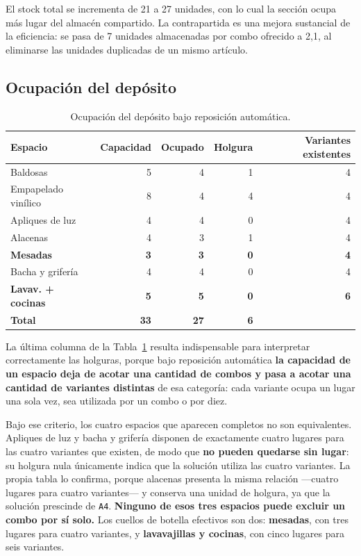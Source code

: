 \documentclass[10pt,a4paper]{article}
\newcommand{\cuello}[1]{\textbf{\textcolor{limita}{#1}}}
\newcommand{\art}[1]{\texttt{#1}}
\begin{document}
El stock total se incrementa de 21 a 27 unidades, con lo cual la sección ocupa
más lugar del almacén compartido. La contrapartida es una mejora sustancial de
la eficiencia: se pasa de 7 unidades almacenadas por combo ofrecido a 2,1, al
eliminarse las unidades duplicadas de un mismo artículo.

\subsection{Ocupación del depósito}

\begin{table}[H]
\centering\small
\caption{Ocupación del depósito bajo reposición automática.}
\label{tab:ocupacion_e2}
\begin{tabular}{lrrrr}
\toprule
\textbf{Espacio} & \textbf{Capacidad} & \textbf{Ocupado} & \textbf{Holgura} & \textbf{Variantes existentes} \\
\midrule
Baldosas                  & 5 & 4 & 1 & 4 \\
Empapelado vinílico       & 8 & 4 & 4 & 4 \\
Apliques de luz           & 4 & 4 & 0 & 4 \\
Alacenas                  & 4 & 3 & 1 & 4 \\
\cuello{Mesadas}          & \cuello{3} & \cuello{3} & \cuello{0} & \cuello{4} \\
Bacha y grifería          & 4 & 4 & 0 & 4 \\
\cuello{Lavav. + cocinas} & \cuello{5} & \cuello{5} & \cuello{0} & \cuello{6} \\
\midrule
\textbf{Total} & \textbf{33} & \textbf{27} & \textbf{6} & \\
\bottomrule
\end{tabular}
\end{table}

La última columna de la Tabla~\ref{tab:ocupacion_e2} resulta indispensable para
interpretar correctamente las holguras, porque bajo reposición automática
\textbf{la capacidad de un espacio deja de acotar una cantidad de combos y pasa
a acotar una cantidad de variantes distintas} de esa categoría: cada variante
ocupa un lugar una sola vez, sea utilizada por un combo o por diez.

Bajo ese criterio, los cuatro espacios que aparecen completos no son
equivalentes. Apliques de luz y bacha y grifería disponen de exactamente cuatro
lugares para las cuatro variantes que existen, de modo que \textbf{no pueden
quedarse sin lugar}: su holgura nula únicamente indica que la solución utiliza
las cuatro variantes. La propia tabla lo confirma, porque alacenas presenta la
misma relación —cuatro lugares para cuatro variantes— y conserva una unidad de
holgura, ya que la solución prescinde de \art{A4}. \textbf{Ninguno de esos tres
espacios puede excluir un combo por sí solo.} Los cuellos de botella efectivos
son dos: \textbf{mesadas}, con tres lugares para cuatro variantes, y
\textbf{lavavajillas y cocinas}, con cinco lugares para seis variantes.
\end{document}
